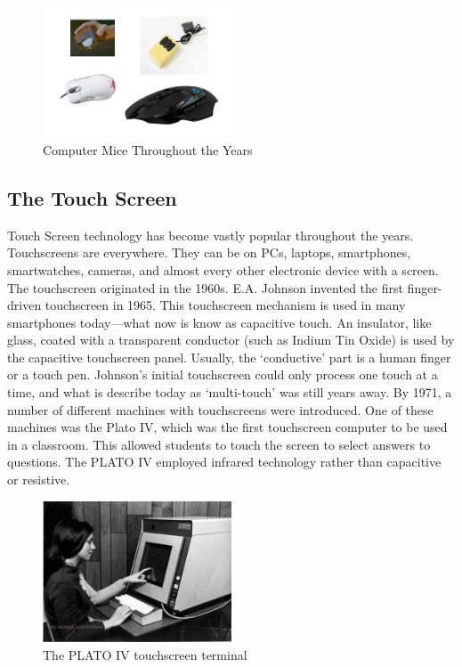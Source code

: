 \documentclass{article}
\begin{document}
\begin{figure}[!ht]
    \caption{Computer Mice Throughout the Years}
    \label{image:mice}
    \centering
    \includegraphics[width=0.5\textwidth]{pics/mice.png}
\end{figure}

\newpage
\subsection{The Touch Screen}
Touch Screen technology has become vastly popular throughout the years. Touchscreens are everywhere. They can be on PCs, laptops, smartphones, smartwatches, cameras, and almost every other electronic device with a screen. The touchscreen originated in the 1960s. E.A. Johnson invented the first finger-driven touchscreen in 1965. This touchscreen mechanism is used in many smartphones today—what now is know as capacitive touch. An insulator, like glass, coated with a transparent conductor (such as Indium Tin Oxide) is used by the capacitive touchscreen panel. Usually, the ‘conductive’ part is a human finger or a touch pen. Johnson’s initial touchscreen could only process one touch at a time, and what is describe today as ‘multi-touch’ was still years away. By 1971, a number of different machines with touchscreens were introduced. One of these machines was the Plato IV, which was the first touchscreen computer to be used in a classroom. This allowed students to touch the screen to select answers to questions. The PLATO IV employed infrared technology rather than capacitive or resistive. 
\cite{ref8}

\begin{figure}[!ht]
    \caption{The PLATO IV touchscreen terminal}
    \label{image:PLATOIV}
    \centering
    \includegraphics[width=0.5\textwidth]{pics/plato_iv.jpg}
\end{figure}
\end{document}
